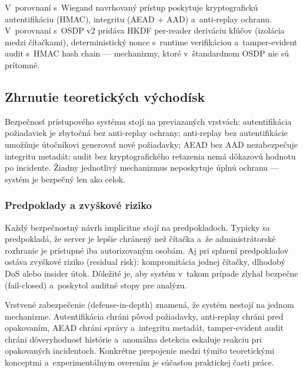V~porovnaní s~Wiegand\cite{Wiegand_Zac2013} navrhovaný prístup poskytuje kryptografickú autentifikáciu (HMAC), integritu (AEAD + AAD) a~anti-replay ochranu. V~porovnaní s~OSDP v2\cite{SIA_OSDP} pridáva HKDF per-reader deriváciu kľúčov (izolácia medzi čítačkami), deterministický nonce s~runtime verifikáciou a~tamper-evident audit s~HMAC hash chain --- mechanizmy, ktoré v~štandardnom OSDP nie sú prítomné\cite{DefenseInDepth,SaltzerSchroeder1975}.


\subsection{Zhrnutie teoretických východísk}

Bezpečnosť prístupového systému stojí na previazaných vrstvách: autentifikácia požiadaviek je zbytočná bez anti-replay ochrany; anti-replay bez autentifikácie umožňuje útočníkovi generovať nové požiadavky; AEAD bez AAD nezabezpečuje integritu metadát; audit bez kryptografického reťazenia nemá dôkazovú hodnotu po incidente. Žiadny jednotlivý mechanizmus neposkytuje úplnú ochranu --- systém je bezpečný len ako celok\cite{DefenseInDepth,NIST80053}.

\subsubsection{Predpoklady a zvyškové riziko}

Každý bezpečnostný návrh implicitne stojí na predpokladoch\cite{NIST80053}. Typicky sa predpokladá, že server je lepšie chránený než čítačka a~že administrátorské rozhranie je prístupné iba autorizovaným osobám. Aj pri splnení predpokladov ostáva zvyškové riziko (residual risk): kompromitácia jednej čítačky, dlhodobý DoS alebo insider útok. Dôležité je, aby systém v~takom prípade zlyhal bezpečne (fail-closed) a~poskytol auditné stopy pre analýzu\cite{SchneierKelsey1999}.

Vrstvené zabezpečenie (defense-in-depth)\cite{DefenseInDepth} znamená, že systém nestojí na jednom mechanizme. Autentifikácia chráni pôvod požiadavky, anti-replay chráni pred opakovaním, AEAD chráni správy a~integritu metadát, tamper-evident audit chráni dôveryhodnosť histórie a~anomálna detekcia eskaluje reakciu pri opakovaných incidentoch. Konkrétne prepojenie medzi týmito teoretickými konceptmi a~experimentálnym overením je súčasťou praktickej časti práce.
